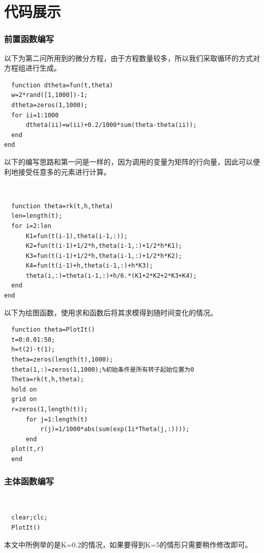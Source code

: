 \documentclass[UTF8,a4paper,10pt]{ctexart}
\begin{document}
\section{代码展示}
\subsubsection{前置函数编写}
以下为第二问所用到的微分方程，由于方程数量较多，所以我们采取循环的方式对方程组进行生成。\newline
~\\
\lstset{language=matlab}
\begin{lstlisting}
  function dtheta=fun(t,theta)
  w=2*rand([1,1000])-1;
  dtheta=zeros(1,1000);
  for ii=1:1000
      dtheta(ii)=w(ii)+0.2/1000*sum(theta-theta(ii));
  end
end
\end{lstlisting}
以下的编写思路和第一问是一样的，因为调用的变量为矩阵的行向量，因此可以便利地接受任意多的元素进行计算。\newline

~\\
\lstset{language=matlab}
\begin{lstlisting}
  function theta=rk(t,h,theta)
  len=length(t);
  for i=2:len
      K1=fun(t(i-1),theta(i-1,:));
      K2=fun(t(i-1)+1/2*h,theta(i-1,:)+1/2*h*K1);
      K3=fun(t(i-1)+1/2*h,theta(i-1,:)+1/2*h*K2);
      K4=fun(t(i-1)+h,theta(i-1,:)+h*K3);
      theta(i,:)=theta(i-1,:)+h/6.*(K1+2*K2+2*K3+K4);
  end
end
\end{lstlisting}
以下为绘图函数，使用求和函数后将其求模得到随时间变化的情况。\newline
~\\
\lstset{language=matlab}
\begin{lstlisting}
  function theta=PlotIt()
  t=0:0.01:50;
  h=t(2)-t(1);
  theta=zeros(length(t),1000);
  theta(1,:)=zeros(1,1000);%初始条件是所有转子起始位置为0
  Theta=rk(t,h,theta);
  hold on
  grid on
  r=zeros(1,length(t));
      for j=1:length(t)
          r(j)=1/1000*abs(sum(exp(1i*Theta(j,:))));
      end
  plot(t,r)
  end
\end{lstlisting}
\subsubsection{主体函数编写}
~\\
\lstset{language=matlab}
\begin{lstlisting}
  clear;clc;
  PlotIt()
\end{lstlisting}
本文中所例举的是K=0.2的情况，如果要得到K=5的情形只需要稍作修改即可。
\end{document}

